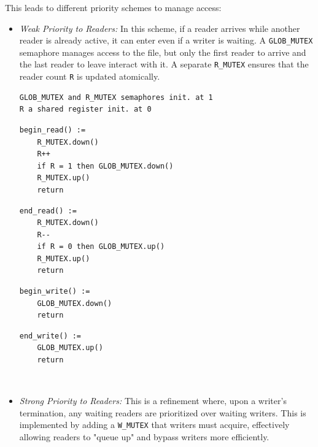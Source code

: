 This leads to different priority schemes to manage access:
\begin{itemize}
    \item \textit{Weak Priority to Readers:} In this scheme, if a reader arrives while another reader is already active, it can enter even if a writer is waiting. A \texttt{GLOB\_MUTEX} semaphore manages access to the file, but only the first reader to arrive and the last reader to leave interact with it. A separate \texttt{R\_MUTEX} ensures that the reader count \texttt{R} is updated atomically.

\begin{minipage}{\textwidth}
\begin{lstlisting}[mathescape]
GLOB_MUTEX and R_MUTEX semaphores init. at 1
R a shared register init. at 0
\end{lstlisting}
\begin{minipage}{0.45\textwidth}
\begin{lstlisting}[mathescape]
begin_read() :=
    R_MUTEX.down()
    R++
    if R = 1 then GLOB_MUTEX.down()
    R_MUTEX.up()
    return
\end{lstlisting}
\end{minipage}
\hfill
\begin{minipage}{0.45\textwidth}
\begin{lstlisting}[mathescape]
end_read() :=
    R_MUTEX.down()
    R--
    if R = 0 then GLOB_MUTEX.up()
    R_MUTEX.up()
    return
\end{lstlisting}
\end{minipage}
\begin{minipage}{0.45\textwidth}
\begin{lstlisting}[mathescape]
begin_write() :=
    GLOB_MUTEX.down()
    return
\end{lstlisting}
\end{minipage}
\hfill
\begin{minipage}{0.45\textwidth}
\begin{lstlisting}[mathescape]
end_write() :=
    GLOB_MUTEX.up()
    return
\end{lstlisting}
\end{minipage}
\end{minipage}\\
    
    \item \textit{Strong Priority to Readers:} This is a refinement where, upon a writer's termination, any waiting readers are prioritized over waiting writers. This is implemented by adding a \texttt{W\_MUTEX} that writers must acquire, effectively allowing readers to "queue up" and bypass writers more efficiently.


\end{itemize}
